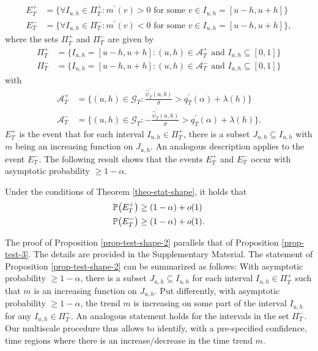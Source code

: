 \begin{align*}
E_T^+ & = \Big\{ \forall I_{u,h} \in \Pi_T^+: m^\prime(v) > 0 \text{ for some } v \in I_{u,h} = [u-h,u+h] \Big\} \\
E_T^- & = \Big\{ \forall I_{u,h} \in \Pi_T^-: m^\prime(v) < 0 \text{ for some } v \in I_{u,h} = [u-h,u+h] \Big\},
\end{align*}
where the sets $\Pi_T^+$ and $\Pi_T^-$ are given by
\begin{align*}
\Pi_T^+ & = \big\{ I_{u,h} = [u-h,u+h]: (u,h) \in \mathcal{A}_T^+ \text{ and } I_{u,h} \subseteq [0,1] \big\} \\
\Pi_T^- & = \big\{ I_{u,h} = [u-h,u+h]: (u,h) \in \mathcal{A}_T^- \text{ and } I_{u,h} \subseteq [0,1] \big\} 
\end{align*}
with 
\begin{align*}
\mathcal{A}_T^+ & = \Big\{ (u,h) \in \mathcal{G}_T: \frac{\widehat{\psi}_T^\prime(u,h)}{\widehat{\sigma}} > q_T^\prime(\alpha) + \lambda(h) \Big\} \\ 
\mathcal{A}_T^- & = \Big\{ (u,h) \in \mathcal{G}_T: -\frac{\widehat{\psi}_T^\prime(u,h)}{\widehat{\sigma}} > q_T^\prime(\alpha) + \lambda(h) \Big\}. 
\end{align*}
$E_T^+$ is the event that for each interval $I_{u,h} \in \Pi_T^+$, there is a subset $J_{u,h} \subseteq I_{u,h}$ with $m$ being an increasing function on $J_{u,h}$. An analogous description applies to the event $E_T^-$. The following result shows that the events $E_T^+$ and $E_T^-$ occur with asymptotic probability $\ge 1-\alpha$. 
\begin{prop}\label{prop-test-shape-2}
Under the conditions of Theorem \ref{theo-stat-shape}, it holds that  
\begin{align*}
\mathbb{P} \big( E_T^+ \big) & \ge (1-\alpha) + o(1) \\
\mathbb{P} \big( E_T^- \big) & \ge (1-\alpha) + o(1). 
\end{align*}
\end{prop}
The proof of Proposition \ref{prop-test-shape-2} parallels that of Proposition \ref{prop-test-3}. The details are provided in the Supplementary Material. The statement of Proposition \ref{prop-test-shape-2} can be summarized as follows: With asymptotic probability $\ge 1-\alpha$, there is a subset $J_{u,h} \subseteq I_{u,h}$ for each interval $I_{u,h} \in \Pi_T^+$ such that $m$ is an increasing function on $J_{u,h}$. Put differently, with asymptotic probability $\ge 1- \alpha$, the trend $m$ is increasing on some part of the interval $I_{u,h}$ for any $I_{u,h} \in \Pi_T^+$. An analogous statement holds for the intervals in the set $\Pi_T^-$. Our multiscale procedure thus allows to identify, with a pre-specified confidence, time regions where there is an increase/decrease in the time trend $m$. 


